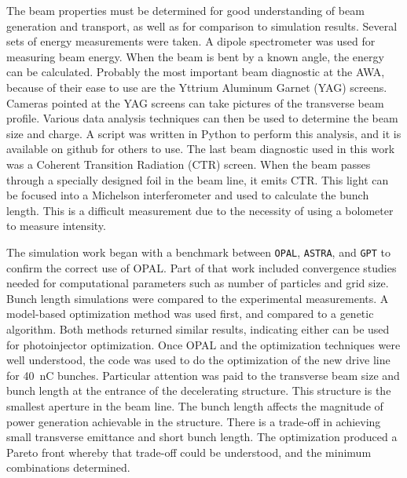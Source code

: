The beam properties must be determined for good understanding of beam generation and transport, 
as well as for comparison to simulation results. Several sets of energy measurements were taken. 
A dipole spectrometer was used for measuring beam energy. 
When the beam is bent by a known angle, the energy can be calculated. 
Probably the most important beam diagnostic at the AWA, 
because of their ease to use are the Yttrium Aluminum Garnet (YAG) screens. 
Cameras pointed at the YAG screens can take pictures of the 
transverse beam profile. 
Various data analysis techniques can then be used to determine 
the beam size and charge. A script was written in Python
to perform this analysis, and it is available on github for others to use. 
The last beam diagnostic used in this work was a Coherent Transition Radiation (CTR) screen. When the beam passes
through a specially designed foil in the beam line, 
it emits CTR. This light can be focused into a Michelson 
interferometer and used to calculate the bunch length. 
This is a difficult measurement due to the necessity of using a 
bolometer to measure intensity. 

The simulation work began with a benchmark between \verb|OPAL|, \verb|ASTRA|, and \verb|GPT| 
to confirm the correct use of OPAL. 
Part of that work included convergence studies needed for computational parameters such as number of particles and grid size.
Bunch length simulations were compared to the experimental measurements. 
A model-based optimization method was used first, 
and compared to a genetic algorithm. 
Both methods returned similar results, indicating either
can be used for photoinjector optimization.  
Once OPAL and the optimization techniques were well understood, 
the code was used to do the optimization of the new drive line for \SI{40}{nC} bunches.  
Particular attention was paid to the transverse beam size and bunch length at the entrance of the decelerating structure.  
This structure is the smallest aperture in the beam line. 
The bunch length affects the magnitude of power generation achievable in the structure.  
There is a trade-off in achieving small transverse emittance and short bunch length.  
The optimization produced a Pareto front whereby that trade-off could be understood, and the minimum combinations determined.

